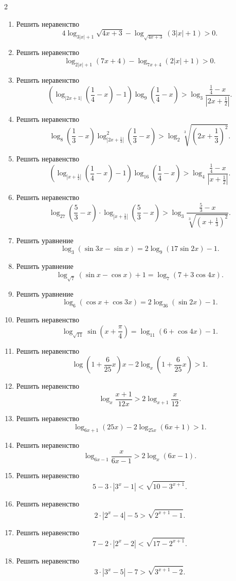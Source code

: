 \documentclass[14pt,a4paper,landscape]{article}
\begin{document}
\begin{multicols}{2}
\begin{enumerate}[label=3.\arabic*, leftmargin=1.5em]
    \item Решить неравенство $$4\log_{3|x|+1}\sqrt{4x+3} - \log_{\sqrt{4x+3}}(3|x|+1) > 0.$$
    \item Решить неравенство $$\log_{2|x|+1}(7x+4) - \log_{7x+4}(2|x|+1) > 0.$$
    \item Решить неравенство $$\left(\log_{|2x+1|}\left(\frac{1}{4}-x\right)-1\right)\log_9\left(\frac{1}{4}-x\right) > \log_3 \frac{\frac{1}{4}-x}{|2x+\frac{1}{2}|}.$$
    \item Решить неравенство $$\log_8\left(\frac{1}{3}-x\right)\log_{|2x+\frac{1}{3}|}^2\left(\frac{1}{3}-x\right) > \log_2 \sqrt[3]{\left(2x+\frac{1}{3}\right)^2}.$$
    \item Решить неравенство $$\left(\log_{|x+\frac{1}{2}|}\left(\frac{1}{4}-x\right)-1\right)\log_{16}\left(\frac{1}{4}-x\right) > \log_4 \frac{\frac{1}{4}-x}{|x+\frac{1}{2}|}.$$
    \item Решить неравенство $$\log_{27}\left(\frac{5}{3}-x\right) \cdot \log_{|x+\frac{1}{3}|}\left(\frac{5}{3}-x\right) > \log_3 \frac{\frac{5}{3}-x}{\sqrt[3]{\left(x+\frac{1}{3}\right)^2}}.$$
    \item Решить уравнение $$\log_3(\sin 3x - \sin x) = 2\log_9(17\sin 2x) - 1.$$
    \item Решить уравнение $$\log_{\sqrt{7}}(\sin x - \cos x) + 1 = \log_7(7 + 3\cos 4x).$$
    \item Решить уравнение $$\log_6(\cos x + \cos 3x) = 2\log_{36}(\sin 2x) - 1.$$
    \item Решить неравенство $$\log_{\sqrt{11}}\sin\left(x+\frac{\pi}{4}\right) = \log_{11}(6+\cos 4x) - 1.$$
    \item Решить неравенство $$\log\left(1+\frac{6}{25}x\right)x - 2\log_x\left(1+\frac{6}{25}x\right) > 1.$$
    \item Решить неравенство $$\log_x \frac{x+1}{12x} > 2\log_{x+1} \frac{x}{12}.$$
    \item Решить неравенство $$\log_{6x+1}(25x) - 2\log_{25x}(6x+1) > 1.$$
    \item Решить неравенство $$\log_{6x-1} \frac{x}{6x-1} > 2\log_x(6x-1).$$
    \item Решить неравенство $$5 - 3 \cdot |3^x - 1| < \sqrt{10 - 3^{x+1}}.$$
    \item Решить неравенство $$2 \cdot |2^x - 4| - 5 > \sqrt{2^{x+1} - 1}.$$
    \item Решить неравенство $$7 - 2 \cdot |2^x - 2| < \sqrt{17 - 2^{x+1}}.$$
    \item Решить неравенство $$3 \cdot |3^x - 5| - 7 > \sqrt{3^{x+1} - 2}.$$

\end{enumerate}
\end{multicols}
\end{document}
